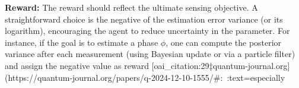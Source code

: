 \documentclass[12pt]{article}
\begin{document}
{\bf Reward:} The reward should reflect the ultimate sensing objective.  A straightforward choice is the negative of the estimation error variance (or its logarithm), encouraging the agent to reduce uncertainty in the parameter.  For instance, if the goal is to estimate a phase $\phi$, one can compute the posterior variance after each measurement (using Bayesian update or via a particle filter) and assign the negative value as reward [oai_citation:29‡quantum-journal.org](https://quantum-journal.org/papers/q-2024-12-10-1555/#:~:text=especially%
\end{document}
